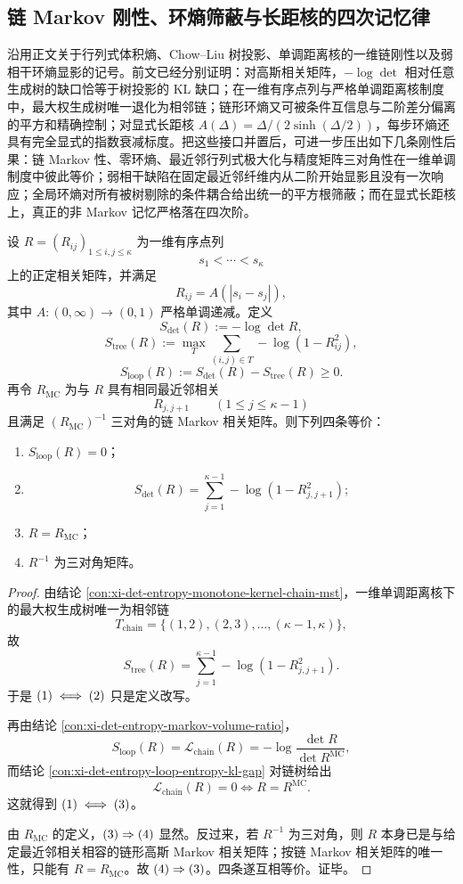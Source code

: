 \subsection{链 Markov 刚性、环熵筛蔽与长距核的四次记忆律}\label{subsec:conclusion-chain-markov-loop-memory-rigidity}
沿用正文关于行列式体积熵、Chow--Liu 树投影、单调距离核的一维链刚性以及弱相干环熵显影的记号。前文已经分别证明：对高斯相关矩阵，\(-\log\det\) 相对任意生成树的缺口恰等于树投影的 KL 缺口；在一维有序点列与严格单调距离核制度中，最大权生成树唯一退化为相邻链；链形环熵又可被条件互信息与二阶差分偏离的平方和精确控制；对显式长距核 \(A(\Delta)=\Delta/(2\sinh(\Delta/2))\)，每步环熵还具有完全显式的指数衰减标度。把这些接口并置后，可进一步压出如下几条刚性后果：链 Markov 性、零环熵、最近邻行列式极大化与精度矩阵三对角性在一维单调制度中彼此等价；弱相干缺陷在固定最近邻纤维内从二阶开始显影且没有一次响应；全局环熵对所有被树剔除的条件耦合给出统一的平方根筛蔽；而在显式长距核上，真正的非 Markov 记忆严格落在四次阶。

\begin{theorem}\label{thm:conclusion-chain-markov-rigidity-fourfold-equivalence}
设 \(R=(R_{ij})_{1\le i,j\le \kappa}\) 为一维有序点列
\[
s_1<\cdots<s_\kappa
\]
上的正定相关矩阵，并满足
\[
R_{ij}=A(|s_i-s_j|),
\]
其中 \(A:(0,\infty)\to(0,1)\) 严格单调递减。定义
\[
S_{\det}(R):=-\log\det R,
\]
\[
S_{\mathrm{tree}}(R):=\max_T\sum_{(i,j)\in T}-\log(1-R_{ij}^2),
\]
\[
S_{\mathrm{loop}}(R):=S_{\det}(R)-S_{\mathrm{tree}}(R)\ge 0.
\]
再令 \(R_{\mathrm{MC}}\) 为与 \(R\) 具有相同最近邻相关
\[
R_{j,j+1}\qquad (1\le j\le \kappa-1)
\]
且满足 \((R_{\mathrm{MC}})^{-1}\) 三对角的链 Markov 相关矩阵。则下列四条等价：
\begin{enumerate}
  \item \(S_{\mathrm{loop}}(R)=0\)；
  \item
  \[
  S_{\det}(R)=\sum_{j=1}^{\kappa-1}-\log(1-R_{j,j+1}^2);
  \]
  \item \(R=R_{\mathrm{MC}}\)；
  \item \(R^{-1}\) 为三对角矩阵。
\end{enumerate}
\end{theorem}
\begin{proof}
由结论 \ref{con:xi-det-entropy-monotone-kernel-chain-mst}，一维单调距离核下的最大权生成树唯一为相邻链
\[
T_{\mathrm{chain}}=\{(1,2),(2,3),\dots,(\kappa-1,\kappa)\},
\]
故
\[
S_{\mathrm{tree}}(R)=\sum_{j=1}^{\kappa-1}-\log(1-R_{j,j+1}^2).
\]
于是 \(\textup{(1)}\iff\textup{(2)}\) 只是定义改写。

再由结论 \ref{con:xi-det-entropy-markov-volume-ratio}，
\[
S_{\mathrm{loop}}(R)=\mathcal L_{\mathrm{chain}}(R)
=-\log\frac{\det R}{\det R^{\mathrm{MC}}},
\]
而结论 \ref{con:xi-det-entropy-loop-entropy-kl-gap} 对链树给出
\[
\mathcal L_{\mathrm{chain}}(R)=0
\iff
R=R^{\mathrm{MC}}.
\]
这就得到 \(\textup{(1)}\iff\textup{(3)}\)。

由 \(R_{\mathrm{MC}}\) 的定义，\(\textup{(3)}\Rightarrow\textup{(4)}\) 显然。反过来，若 \(R^{-1}\) 为三对角，则 \(R\) 本身已是与给定最近邻相关相容的链形高斯 Markov 相关矩阵；按链 Markov 相关矩阵的唯一性，只能有 \(R=R_{\mathrm{MC}}\)。故 \(\textup{(4)}\Rightarrow\textup{(3)}\)。四条遂互相等价。证毕。
\end{proof}

